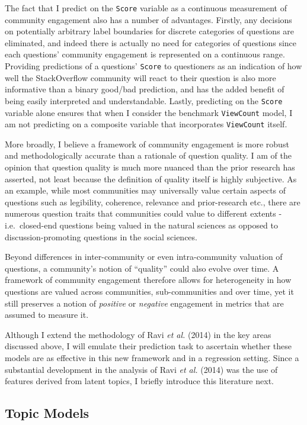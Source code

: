 \documentclass[11pt,preprint, authoryear]{article}
\begin{document}
The fact that I predict on the \texttt{Score} variable as a continuous
measurement of community engagement also has a number of advantages.
Firstly, any decisions on potentially arbitrary label boundaries for
discrete categories of questions are eliminated, and indeed there is
actually no need for categories of questions since each questions'
community engagement is represented on a continuous range. Providing
predictions of a questions' \texttt{Score} to questioners as an
indication of how well the StackOverflow community will react to their
question is also more informative than a binary good/bad prediction, and
has the added benefit of being easily interpreted and understandable.
Lastly, predicting on the \texttt{Score} variable alone ensures that
when I consider the benchmark \texttt{ViewCount} model, I am not
predicting on a composite variable that incorporates \texttt{ViewCount}
itself.

More broadly, I believe a framework of community engagement is more
robust and methodologically accurate than a rationale of question
quality. I am of the opinion that question quality is much more nuanced
than the prior research has asserted, not least because the definition
of quality itself is highly subjective. As an example, while most
communities may universally value certain aspects of questions such as
legibility, coherence, relevance and prior-research etc., there are
numerous question traits that communities could value to different
extents - i.e.~closed-end questions being valued in the natural sciences
as opposed to discussion-promoting questions in the social sciences.

Beyond differences in inter-community or even intra-community valuation
of questions, a community's notion of ``quality'' could also evolve over
time. A framework of community engagement therefore allows for
heterogeneity in how questions are valued across communities,
sub-communities and over time, yet it still preserves a notion of
\emph{positive} or \emph{negative} engagement in metrics that are
assumed to measure it.

Although I extend the methodology of Ravi \emph{et al.} (2014) in the
key areas discussed above, I will emulate their prediction task to
ascertain whether these models are as effective in this new framework
and in a regression setting. Since a substantial development in the
analysis of Ravi \emph{et al.} (2014) was the use of features derived
from latent topics, I briefly introduce this literature next.

\subsection{\texorpdfstring{Topic Models
\label{lda_lit}}{Topic Models }}\label{topic-models}
\end{document}
